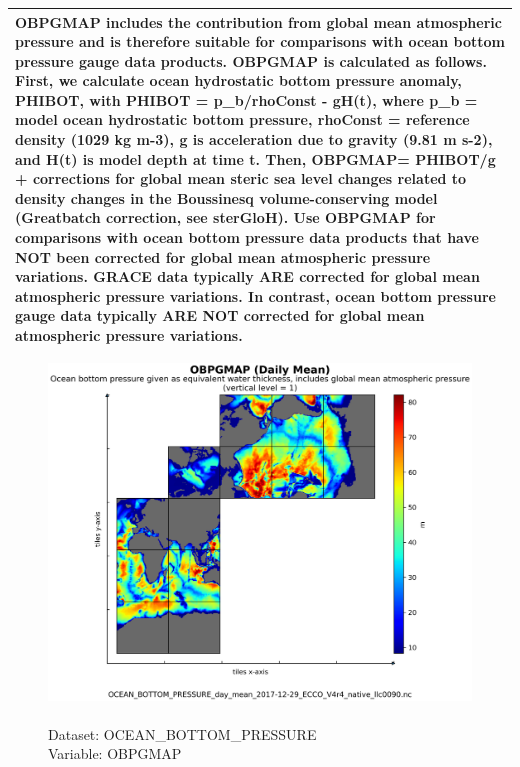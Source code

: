 \begin{longtable}{|p{}|p{}|p{}|p{}|}
\multicolumn{4}{|p{1\textwidth}|}{OBPGMAP includes the contribution from global mean atmospheric pressure and is therefore suitable for comparisons with ocean bottom pressure gauge data products. OBPGMAP is calculated as follows. First, we calculate ocean hydrostatic bottom pressure anomaly, PHIBOT, with PHIBOT = p\_b/rhoConst - gH(t), where p\_b = model ocean hydrostatic bottom pressure, rhoConst = reference density (1029 kg m-3), g is acceleration due to gravity (9.81 m s-2), and H(t) is model depth at time t. Then, OBPGMAP= PHIBOT/g + corrections for global mean steric sea level changes related to density changes in the Boussinesq volume-conserving model (Greatbatch correction, see sterGloH). Use OBPGMAP for comparisons with ocean bottom pressure data products that have NOT been corrected for global mean atmospheric pressure variations. GRACE data typically ARE corrected for global mean atmospheric pressure variations. In contrast, ocean bottom pressure gauge data typically ARE NOT corrected for global mean atmospheric pressure variations.} \\ \hline
\end{longtable}

\begin{figure}[H]
\centering
\includegraphics[scale=0.5]{../images/plots/native_plots/Ocean_Bottom_Pressure/OBPGMAP.png}
\caption{\\Dataset: OCEAN\_BOTTOM\_PRESSURE\\Variable: OBPGMAP}
\label{tab:table-OCEAN_BOTTOM_PRESSURE_OBPGMAP-Plot}
\end{figure}
\pagebreak
